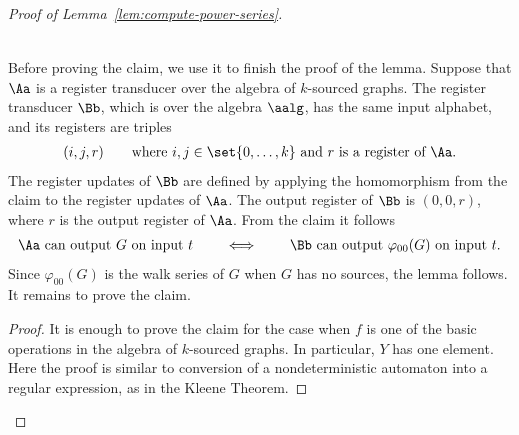 \begin{proof}[Proof of Lemma~\ref{lem:compute-power-series}]
\begin{claim}
\begin{align*}
{            }
            \end{align*}
        \end{claim}
        Before proving the claim, we use it to finish the proof of the lemma. Suppose that $\Aa$ is a register transducer over the algebra of $k$-sourced graphs. The register transducer  $\Bb$, which is over the algebra $\aalg$, has the same input alphabet, and its registers are triples 
        \begin{align*}
        (i,j,r) \qquad \text{where $i,j \in \set{0,\ldots,k}$ and $r$ is a register of $\Aa$.}
        \end{align*}
         The register updates of $\Bb$ are defined by applying the homomorphism from the claim  to the register updates of $\Aa$. 
        The output register of $\Bb$ is $(0,0,r)$, where  $r$ is the output register of $\Aa$.  From the claim it follows 
        \begin{align*}
        \text{$\Aa$ can output $G$ on input $t$} \qquad \iff \qquad 
        \text{$\Bb$ can output $\varphi_{00}(G)$ on input $t$}.
        \end{align*}
        Since $\varphi_{00}(G)$ is the walk series of $G$ when $G$ has no sources, the lemma follows. It remains to prove the claim.

        \begin{proof} 
            It is enough to prove the claim for the case when $f$ is one of the basic operations in the algebra of $k$-sourced graphs. In particular, $Y$ has one element. Here the proof is similar to conversion of a nondeterministic automaton into a regular expression, as in the Kleene Theorem.
            

\end{proof}
\end{proof}

